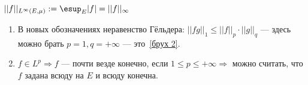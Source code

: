 \begin{enumerate}
          \(||f||_{L^{\infty}(E, \mu)}: = \esup_E |f| = ||f||_{\infty}\)

          \begin{remark}\itemfix
              \begin{enumerate}
                  \item В новых обозначениях неравенство Гёльдера: \(||fg||_1 \leq ||f||_p \cdot ||g||_q\) --- здесь можно брать \(p = 1, q = +\infty\) --- это~\eqref{брух 2}.
                  \item \(f \in L^p \Rightarrow f\) --- почти везде конечно, если \(1 \leq p \leq +\infty \Rightarrow \) можно считать, что \(f\) задана всюду на \(E\) и всюду конечна.
              \end{enumerate}
          \end{remark}
\end{enumerate}
